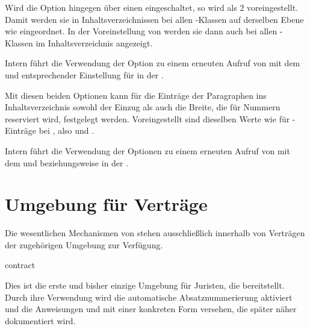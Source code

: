 Wird die Option hingegen über einen
 eingeschaltet,
so wird als  2 voreingestellt. Damit werden sie in
Inhaltsverzeichnissen bei allen \KOMAScript-Klassen auf derselben Ebene wie
%
 eingeordnet. In der
Voreinstellung von  werden sie dann auch bei
allen \KOMAScript-Klassen im Inhaltsverzeichnis angezeigt.

Intern führt die Verwendung der Option zu
einem erneuten Aufruf von
mit dem   und entsprechender Einstellung für
 in der .%
\EndIndexGroup


\begin{Declaration}
\end{Declaration}
Mit diesen beiden Optionen kann für die Einträge der Paragraphen ins
Inhaltsverzeichnis sowohl der Einzug als auch die Breite, die für Nummern
reserviert wird, festgelegt werden. Voreingestellt
sind dieselben Werte wie für
-Einträge%
 bei , also
 und .

Intern führt die Verwendung der Optionen
zu einem erneuten Aufruf von
 mit
dem   und 
beziehungsweise  in der
.%
\EndIndexGroup


\section{Umgebung für Verträge}

\BeginIndexGroup
{}
Die wesentlichen Mechanismen von  stehen ausschließlich
innerhalb von Verträgen der zugehörigen Umgebung zur Verfügung.

\begin{Declaration}
  \begin{Environment}{contract}\end{Environment}
\end{Declaration}
Dies ist die erste und bisher einzige Umgebung für Juristen, die
 bereitstellt. Durch ihre Verwendung wird die automatische
Absatznummerierung aktiviert und die Anweisungen
 und  mit
einer konkreten Form versehen, die später näher dokumentiert wird.

